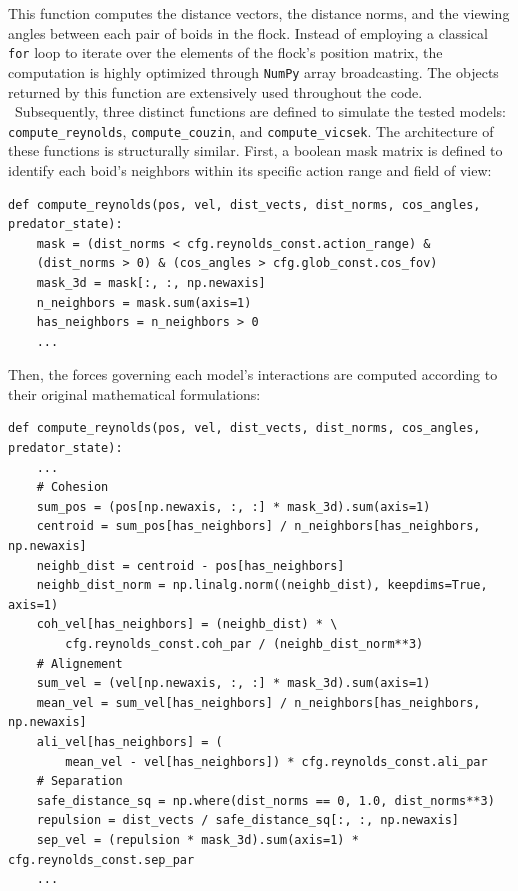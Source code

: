 This function computes the distance vectors, the distance norms, and the viewing angles between each pair of boids in the flock. Instead of employing a classical \texttt{for} loop to iterate over the elements of the flock's position matrix, the computation is highly optimized through \texttt{NumPy} array broadcasting. The objects returned by this function are extensively used throughout the code. \
Subsequently, three distinct functions are defined to simulate the tested models: \texttt{compute\_reynolds}, \texttt{compute\_couzin}, and \texttt{compute\_vicsek}. The architecture of these functions is structurally similar. First, a boolean mask matrix is defined to identify each boid's neighbors within its specific action range and field of view:

\begin{verbatim}
def compute_reynolds(pos, vel, dist_vects, dist_norms, cos_angles, predator_state):
    mask = (dist_norms < cfg.reynolds_const.action_range) & 
    (dist_norms > 0) & (cos_angles > cfg.glob_const.cos_fov)
    mask_3d = mask[:, :, np.newaxis]
    n_neighbors = mask.sum(axis=1)
    has_neighbors = n_neighbors > 0
    ...
\end{verbatim}

Then, the forces governing each model's interactions are computed according to their original mathematical formulations:

\begin{verbatim}
def compute_reynolds(pos, vel, dist_vects, dist_norms, cos_angles, predator_state):
    ...
    # Cohesion
    sum_pos = (pos[np.newaxis, :, :] * mask_3d).sum(axis=1)
    centroid = sum_pos[has_neighbors] / n_neighbors[has_neighbors, np.newaxis]
    neighb_dist = centroid - pos[has_neighbors]
    neighb_dist_norm = np.linalg.norm((neighb_dist), keepdims=True, axis=1)
    coh_vel[has_neighbors] = (neighb_dist) * \
        cfg.reynolds_const.coh_par / (neighb_dist_norm**3)
    # Alignement
    sum_vel = (vel[np.newaxis, :, :] * mask_3d).sum(axis=1)
    mean_vel = sum_vel[has_neighbors] / n_neighbors[has_neighbors, np.newaxis]
    ali_vel[has_neighbors] = (
        mean_vel - vel[has_neighbors]) * cfg.reynolds_const.ali_par
    # Separation
    safe_distance_sq = np.where(dist_norms == 0, 1.0, dist_norms**3)
    repulsion = dist_vects / safe_distance_sq[:, :, np.newaxis]
    sep_vel = (repulsion * mask_3d).sum(axis=1) * cfg.reynolds_const.sep_par
    ...
\end{verbatim}

